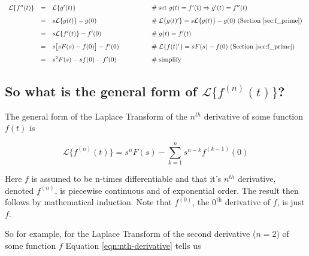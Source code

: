 \documentclass{article}
\theoremstyle{definition}
\begin{document}
\begin{equation*}
\begin{array}{lllll}
\mathcal{L}\{f^{\prime \prime}(t)\}           
&=&  \mathcal{L}\{g^\prime (t)\}                                 &\qquad \qquad \mathrel{\#} \text{set $g(t) = f^\prime(t) \Rightarrow g^\prime(t) = f^{\prime \prime}(t)$}                         \\   
[8pt]
&=& s \mathcal{L}\{g(t)\}  - g(0)                                 &\qquad  \qquad \mathrel{\#} \mathcal{L}\{g(t)^\prime\} = s \mathcal{L}\{g(t)\}  - g(0) \text{ (Section \ref{sec:f_prime})}   \\   
[8pt]
&=& s \mathcal{L}\{f^\prime(t)\} - f^\prime(0)             &\qquad \qquad \mathrel{\#} g(t) = f^\prime(t)                                                                                                                   \\
[8pt] 
&=& s \big [ sF(s) - f(0) \big ] - f^\prime(0)                 &\qquad \qquad \mathrel{\#} \mathcal{L}\{f(t)^\prime\} = s F(s) -f(0) \text{ (Section \ref{sec:f_prime})}                             \\  
[8pt]
&=& s^2F(s) - sf(0) - f^\prime(0)                                &\qquad \qquad \mathrel{\#} \text{simplify}
\end{array}
\end{equation*}

\smallskip
\subsection{So what is the general form of $\mathcal{L}\{f^{(n)}(t)\}$?}
\bigskip
\noindent
The general form of the Laplace Transform of the $n^{th}$ derivative of some function $f(t)$ is 

\bigskip
\begin{equation}
\mathcal{L}\{f^{(n)}(t)\} =  s^{n}F(s)- \sum_{k=1}^n s^{n-k} f^{(k-1)}(0)
\label{eqn:nth-derivative}
\end{equation}

\bigskip  
\noindent
Here $f$ is assumed to be n-times differentiable and that it's $n^{th}$ derivative, denoted $f^{(n)}$, is piecewise continuous and of exponential order. The 
result then follows by mathematical induction. Note that $f^{(0)}$, the $0^{\text{th}}$ derivative of $f$, is just $f$.

\bigskip
\noindent
So for example, for the Laplace Transform of the second derivative ($n = 2$) of some function $f$ Equation \ref{eqn:nth-derivative} tells us
\end{document}
